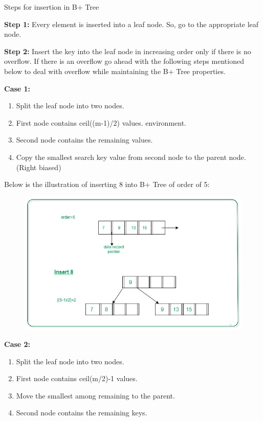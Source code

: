 \documentclass[11pt, a4paper]{article}
\begin{document}
\noindent Steps for insertion in B+ Tree \vspace{0.5cm}

\noindent \textbf{Step 1:} Every element is inserted into a leaf node. So, go to the appropriate leaf node.

\noindent \textbf{Step 2:} Insert the key into the leaf node in increasing order only if there is no overflow. If there is an overflow go ahead with the following steps mentioned below to deal with overflow while maintaining the B+ Tree properties.

\noindent \textbf{Case 1:}

\begin{enumerate}
  \item Split the leaf node into two nodes.
  \item First node contains ceil((m-1)/2) values. environment.
  \item Second node contains the remaining values.
  \item Copy the smallest search key value from second node to the parent node.(Right biased)
\end{enumerate}

\noindent Below is the illustration of inserting 8 into B+ Tree of order of 5:

\begin{figure}[h]
    \centering
    \includegraphics[scale=0.4]{in1.jpeg}
    \label{in1}
\end{figure}

\noindent \textbf{Case 2:}

\begin{enumerate}
  \item Split the leaf node into two nodes.
  \item First node contains ceil(m/2)-1 values.
  \item Move the smallest among remaining to the parent.
  \item Second node contains the remaining keys.
\end{enumerate}
\end{document}
